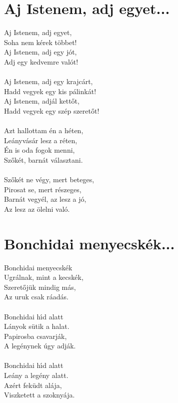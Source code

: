 \section{Aj Istenem, adj egyet...}
Aj Istenem, adj egyet,\\
Soha nem kérek többet!\\
Aj Istenem, adj egy jót,\\
Adj egy kedvemre valót!\\\\
Aj Istenem, adj egy krajcárt,\\
Hadd vegyek egy kis pálinkát!\\
Aj Istenem, adjál kettőt,\\
Hadd vegyek egy szép szeretőt!\\\\
Azt hallottam én a héten,\\
Leányvásár lesz a réten,\\
Én is oda fogok menni,\\
Szőkét, barnát választani.\\\\
Szőkét ne végy, mert beteges,\\
Pirosat se, mert részeges,\\
Barnát vegyél, az lesz a jó,\\
Az lesz az ölelni való.\\
\section{Bonchidai menyecskék...}
Bonchidai menyecskék\\
Ugrálnak, mint a kecskék,\\
Szeretőjük mindig más,\\
Az uruk csak ráadás.\\\\
Bonchidai hı́d alatt\\
Lányok sütik a halat.\\
Papirosba csavarják,\\
A legénynek úgy adják.\\\\
Bonchidai hı́d alatt\\
Leány a legény alatt.\\
Azért feküdt alája,\\
Viszketett a szoknyája.\\
